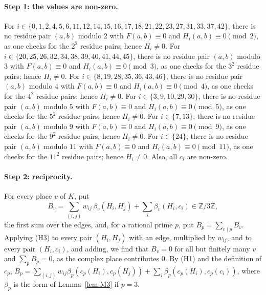 \documentclass[11pt]{article}
\newcommand{\Z}{\mathbb{Z}}
\begin{document}
\paragraph{Step 1: the values are non-zero.} For $i\in\{0,\allowbreak 1,\allowbreak 2,\allowbreak 4,\allowbreak 5,\allowbreak 6,\allowbreak 11,\allowbreak 12,\allowbreak 14,\allowbreak 15,\allowbreak 16,\allowbreak 17,\allowbreak 18,\allowbreak 21,\allowbreak 22,\allowbreak 23,\allowbreak 27,\allowbreak 31,\allowbreak 33,\allowbreak 37,\allowbreak 42\}$, there is no residue pair $(a,b)$ modulo $2$ with $F(a,b)\equiv0$ and $H_i(a,b)\equiv0\pmod{2}$, as one checks for the $2^2$ residue pairs; hence $H_i\neq0$. For $i\in\{20,\allowbreak 25,\allowbreak 26,\allowbreak 32,\allowbreak 34,\allowbreak 38,\allowbreak 39,\allowbreak 40,\allowbreak 41,\allowbreak 44,\allowbreak 45\}$, there is no residue pair $(a,b)$ modulo $3$ with $F(a,b)\equiv0$ and $H_i(a,b)\equiv0\pmod{3}$, as one checks for the $3^2$ residue pairs; hence $H_i\neq0$. For $i\in\{8,\allowbreak 19,\allowbreak 28,\allowbreak 35,\allowbreak 36,\allowbreak 43,\allowbreak 46\}$, there is no residue pair $(a,b)$ modulo $4$ with $F(a,b)\equiv0$ and $H_i(a,b)\equiv0\pmod{4}$, as one checks for the $4^2$ residue pairs; hence $H_i\neq0$. For $i\in\{3,\allowbreak 9,\allowbreak 10,\allowbreak 29,\allowbreak 30\}$, there is no residue pair $(a,b)$ modulo $5$ with $F(a,b)\equiv0$ and $H_i(a,b)\equiv0\pmod{5}$, as one checks for the $5^2$ residue pairs; hence $H_i\neq0$. For $i\in\{7,\allowbreak 13\}$, there is no residue pair $(a,b)$ modulo $9$ with $F(a,b)\equiv0$ and $H_i(a,b)\equiv0\pmod{9}$, as one checks for the $9^2$ residue pairs; hence $H_i\neq0$. For $i\in\{24\}$, there is no residue pair $(a,b)$ modulo $11$ with $F(a,b)\equiv0$ and $H_i(a,b)\equiv0\pmod{11}$, as one checks for the $11^2$ residue pairs; hence $H_i\neq0$. Also, all $c_i$ are non-zero.

\paragraph{Step 2: reciprocity.} For every place $v$ of $K$, put
\begin{equation}\label{eq:B}
B_v=\sum_{(i,j)}w_{ij}\,\beta_v(H_i,H_j)+\sum_i\beta_v(H_i,c_i)\in\Z/3\Z,
\end{equation}
the first sum over the edges, and, for a rational prime $p$, put $B_p=\sum_{v\mid p}B_v$. Applying (H3) to every pair $(H_i,H_j)$ with an edge, multiplied by $w_{ij}$, and to every pair $(H_i,c_i)$, and adding, we find that $B_v=0$ for all but finitely many $v$ and $\sum_pB_p=0$, as the complex place contributes $0$. By (H1) and the definition of $c_p$, $B_p=\sum_{(i,j)}w_{ij}\beta_p(c_p(H_i),c_p(H_j))+\sum_i\beta_p(c_p(H_i),c_p(c_i))$, where $\beta_p$ is the form of Lemma~\ref{lem:M3} if $p=3$.
\end{document}
